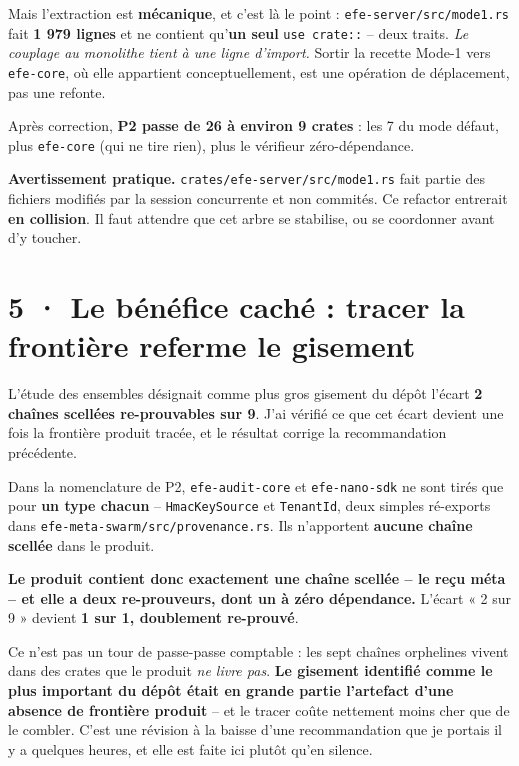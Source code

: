 \documentclass[10pt]{article}
\newcommand{\code}[1]{\texttt{\small #1}}
\begin{document}
Mais l'extraction est \textbf{mécanique}, et c'est là le point : \code{efe-server/src/mode1.rs} fait
\textbf{1 979 lignes} et ne contient qu'\textbf{un seul} \code{use crate::} -- deux traits.
\emph{Le couplage au monolithe tient à une ligne d'import.} Sortir la recette Mode-1 vers
\code{efe-core}, où elle appartient conceptuellement, est une opération de déplacement, pas une refonte.

\begin{acquis}
Après correction, \textbf{P2 passe de 26 à environ 9 crates} : les 7 du mode défaut, plus
\code{efe-core} (qui ne tire rien), plus le vérifieur zéro-dépendance.
\end{acquis}

\begin{alerte}
\textbf{Avertissement pratique.} \code{crates/efe-server/src/mode1.rs} fait partie des fichiers
modifiés par la session concurrente et non commités. Ce refactor entrerait \textbf{en collision}. Il
faut attendre que cet arbre se stabilise, ou se coordonner avant d'y toucher.
\end{alerte}

\section{5 · Le bénéfice caché : tracer la frontière referme le gisement}

L'étude des ensembles désignait comme plus gros gisement du dépôt l'écart \textbf{2 chaînes scellées
re-prouvables sur 9}. J'ai vérifié ce que cet écart devient une fois la frontière produit tracée, et le
résultat corrige la recommandation précédente.

Dans la nomenclature de P2, \code{efe-audit-core} et \code{efe-nano-sdk} ne sont tirés que pour
\textbf{un type chacun} -- \code{HmacKeySource} et \code{TenantId}, deux simples ré-exports dans
\code{efe-meta-swarm/src/provenance.rs}. Ils n'apportent \textbf{aucune chaîne scellée} dans le produit.

\begin{acquis}
\textbf{Le produit contient donc exactement une chaîne scellée -- le reçu méta -- et elle a deux
re-prouveurs, dont un à zéro dépendance.} L'écart « 2 sur 9 » devient \textbf{1 sur 1, doublement
re-prouvé}.
\end{acquis}

Ce n'est pas un tour de passe-passe comptable : les sept chaînes orphelines vivent dans des crates que
le produit \emph{ne livre pas}. \textbf{Le gisement identifié comme le plus important du dépôt était en
grande partie l'artefact d'une absence de frontière produit} -- et le tracer coûte nettement moins cher
que de le combler. C'est une révision à la baisse d'une recommandation que je portais il y a quelques
heures, et elle est faite ici plutôt qu'en silence.
\end{document}
